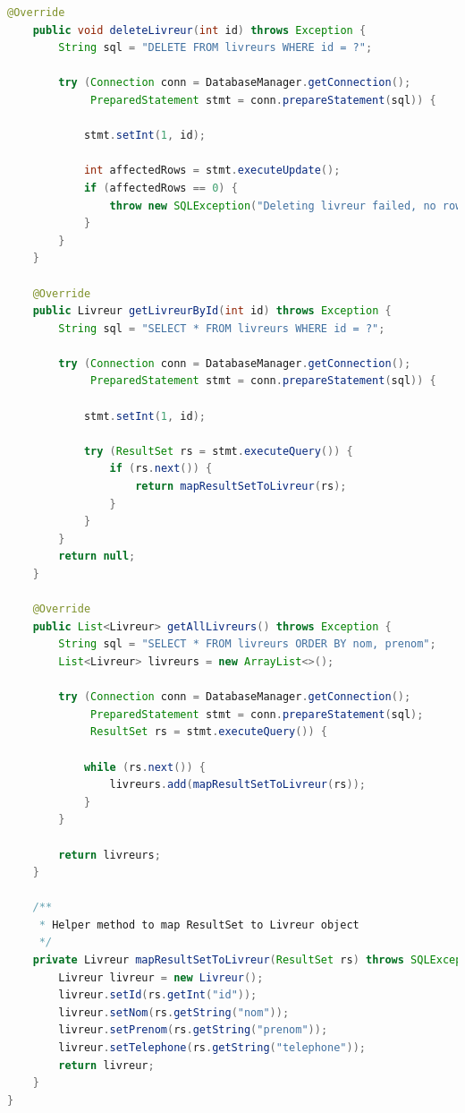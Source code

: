 \documentclass{rapportENSIAS}
\begin{document}
\begin{lstlisting}[language=Java, caption=Impl\'{e}mentation LivreurDAOImpl compl\`{e}te]
    @Override
    public void deleteLivreur(int id) throws Exception {
        String sql = "DELETE FROM livreurs WHERE id = ?";
        
        try (Connection conn = DatabaseManager.getConnection();
             PreparedStatement stmt = conn.prepareStatement(sql)) {
            
            stmt.setInt(1, id);
            
            int affectedRows = stmt.executeUpdate();
            if (affectedRows == 0) {
                throw new SQLException("Deleting livreur failed, no rows affected.");
            }
        }
    }

    @Override
    public Livreur getLivreurById(int id) throws Exception {
        String sql = "SELECT * FROM livreurs WHERE id = ?";
        
        try (Connection conn = DatabaseManager.getConnection();
             PreparedStatement stmt = conn.prepareStatement(sql)) {
            
            stmt.setInt(1, id);
            
            try (ResultSet rs = stmt.executeQuery()) {
                if (rs.next()) {
                    return mapResultSetToLivreur(rs);
                }
            }
        }
        return null;
    }

    @Override
    public List<Livreur> getAllLivreurs() throws Exception {
        String sql = "SELECT * FROM livreurs ORDER BY nom, prenom";
        List<Livreur> livreurs = new ArrayList<>();
        
        try (Connection conn = DatabaseManager.getConnection();
             PreparedStatement stmt = conn.prepareStatement(sql);
             ResultSet rs = stmt.executeQuery()) {
            
            while (rs.next()) {
                livreurs.add(mapResultSetToLivreur(rs));
            }
        }
        
        return livreurs;
    }
    
    /**
     * Helper method to map ResultSet to Livreur object
     */
    private Livreur mapResultSetToLivreur(ResultSet rs) throws SQLException {
        Livreur livreur = new Livreur();
        livreur.setId(rs.getInt("id"));
        livreur.setNom(rs.getString("nom"));
        livreur.setPrenom(rs.getString("prenom"));
        livreur.setTelephone(rs.getString("telephone"));
        return livreur;
    }
}
\end{lstlisting}
\end{document}
